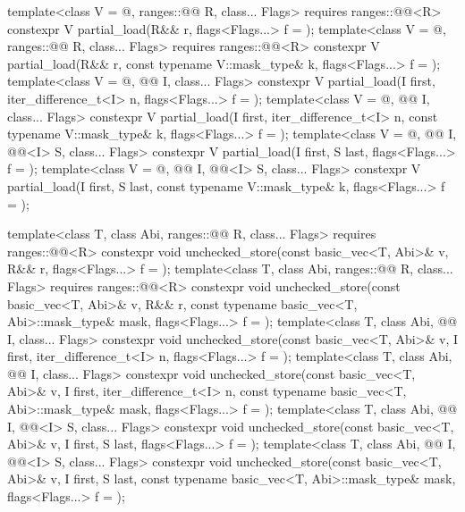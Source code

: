 \begin{codeblock}
{  template<class V = @\seebelow@, ranges::@@ R, class... Flags>
    requires ranges::@@<R>
    constexpr V partial_load(R&& r, flags<Flags...> f = {});
  template<class V = @\seebelow@, ranges::@@ R, class... Flags>
    requires ranges::@@<R>
    constexpr V partial_load(R&& r, const typename V::mask_type& k,
                             flags<Flags...> f = {});
  template<class V = @\seebelow@, @@ I, class... Flags>
    constexpr V partial_load(I first, iter_difference_t<I> n, flags<Flags...> f = {});
  template<class V = @\seebelow@, @@ I, class... Flags>
    constexpr V partial_load(I first, iter_difference_t<I> n,
                             const typename V::mask_type& k, flags<Flags...> f = {});
  template<class V = @\seebelow@, @@ I, @@<I> S, class... Flags>
    constexpr V partial_load(I first, S last, flags<Flags...> f = {});
  template<class V = @\seebelow@, @@ I, @@<I> S, class... Flags>
    constexpr V partial_load(I first, S last, const typename V::mask_type& k,
                             flags<Flags...> f = {});

  template<class T, class Abi, ranges::@@ R, class... Flags>
    requires ranges::@@<R>
    constexpr void unchecked_store(const basic_vec<T, Abi>& v, R&& r,
                                   flags<Flags...> f = {});
  template<class T, class Abi, ranges::@@ R, class... Flags>
    requires ranges::@@<R>
    constexpr void unchecked_store(const basic_vec<T, Abi>& v, R&& r,
                                   const typename basic_vec<T, Abi>::mask_type& mask,
                                   flags<Flags...> f = {});
  template<class T, class Abi, @@ I, class... Flags>
    constexpr void unchecked_store(const basic_vec<T, Abi>& v, I first,
                                   iter_difference_t<I> n, flags<Flags...> f = {});
  template<class T, class Abi, @@ I, class... Flags>
    constexpr void unchecked_store(const basic_vec<T, Abi>& v, I first,
      iter_difference_t<I> n, const typename basic_vec<T, Abi>::mask_type& mask,
      flags<Flags...> f = {});
  template<class T, class Abi, @@ I, @@<I> S, class... Flags>
    constexpr void unchecked_store(const basic_vec<T, Abi>& v, I first, S last,
                                   flags<Flags...> f = {});
  template<class T, class Abi, @@ I, @@<I> S, class... Flags>
    constexpr void unchecked_store(const basic_vec<T, Abi>& v, I first, S last,
                                   const typename basic_vec<T, Abi>::mask_type& mask,
                                   flags<Flags...> f = {});

}
\end{codeblock}
